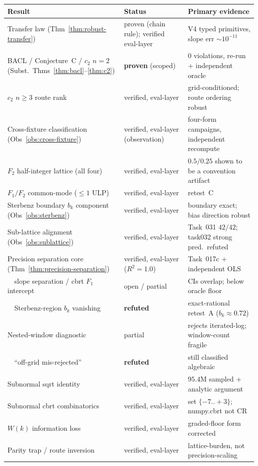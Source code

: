 \documentclass[11pt,a4paper]{article}
\begin{document}
\begin{center}
\begin{tabular}{lll}
\toprule
Result & Status & Primary evidence \\
\midrule
Transfer law (Thm~\ref{thm:robust-transfer}) & proven (chain rule); verified eval-layer & V4 typed primitives, slope err $\sim10^{-11}$ \\
BACL / Conjecture~C / $c_2$ $n{=}2$ (Subst.~Thms~\ref{thm:bacl}--\ref{thm:c2}) & \textbf{proven} (scoped) & $0$ violations, re-run + independent oracle \\
$c_2$ $n\ge3$ route rank & verified, eval-layer & grid-conditioned; route ordering robust \\
Cross-fixture classification (Obs~\ref{obs:cross-fixture}) & verified, eval-layer (observation) & four-form campaigns, independent recompute \\
$F_2$ half-integer lattice (all four) & verified, eval-layer & $0.5/0.25$ shown to be a convention artifact \\
$F_1/F_2$ common-mode ($\le1$ ULP) & verified, eval-layer & retest~C \\
Sterbenz boundary $b_k$ component (Obs~\ref{obs:sterbenz}) & verified, eval-layer & boundary exact; bias direction robust \\
Sub-lattice alignment (Obs~\ref{obs:sublattice}) & verified, eval-layer & Task~031 $42/42$; task032 strong pred.\ refuted \\
Precision separation core (Thm~\ref{thm:precision-separation}) & verified, eval-layer ($R^2{=}1.0$) & Task~017c + independent OLS \\
\ \ slope separation / cbrt $F_1$ intercept & open / partial & CIs overlap; below oracle floor \\
\ \ Sterbenz-region $b_k$ vanishing & \textbf{refuted} & exact-rational retest~A ($b_k{\approx}0.72$) \\
Nested-window diagnostic & partial & rejects iterated-log; window-count fragile \\
\ \ ``off-grid mis-rejected'' & \textbf{refuted} & still classified algebraic \\
Subnormal sqrt identity & verified, eval-layer & $95.4$M sampled + analytic argument \\
Subnormal cbrt combinatorics & verified, eval-layer & set $\{-7..{+}3\}$; numpy.cbrt not CR \\
$W(k)$ information loss & verified, eval-layer & graded-floor form corrected \\
Parity trap / route inversion & verified, eval-layer & lattice-burden, not precision-scaling \\
\bottomrule
\end{tabular}
\end{center}
\end{document}

